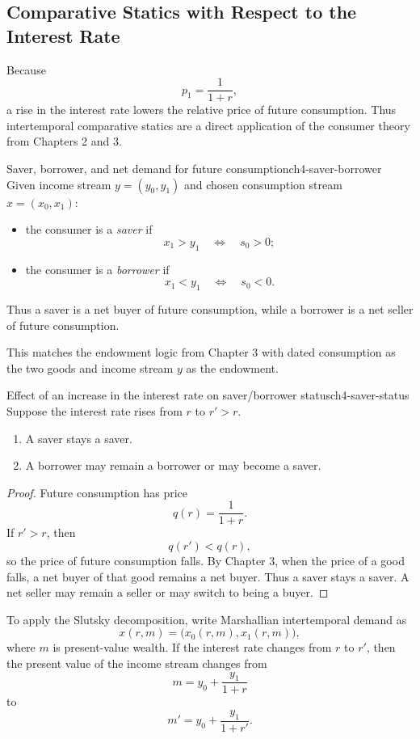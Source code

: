 \subsection{Comparative Statics with Respect to the Interest Rate}

Because
\[
p_1=\frac{1}{1+r},
\]
a rise in the interest rate lowers the relative price of future consumption. Thus intertemporal comparative statics are a direct application of the consumer theory from Chapters 2 and 3.

\begin{definition}{Saver, borrower, and net demand for future consumption}{ch4-saver-borrower}
Given income stream $y=(y_0,y_1)$ and chosen consumption stream $x=(x_0,x_1)$:
\begin{itemize}
    \item the consumer is a \emph{saver} if
    \[
    x_1>y_1
    \quad \Longleftrightarrow \quad
    s_0>0;
    \]
    \item the consumer is a \emph{borrower} if
    \[
    x_1<y_1
    \quad \Longleftrightarrow \quad
    s_0<0.
    \]
\end{itemize}
Thus a saver is a net buyer of future consumption, while a borrower is a net seller of future consumption.
\end{definition}

This matches the endowment logic from Chapter 3 with dated consumption as the two goods and income stream $y$ as the endowment.

\begin{theorem}{Effect of an increase in the interest rate on saver/borrower status}{ch4-saver-status}
Suppose the interest rate rises from $r$ to $r'>r$.
\begin{enumerate}
    \item A saver stays a saver.
    \item A borrower may remain a borrower or may become a saver.
\end{enumerate}
\end{theorem}

\begin{proof}
Future consumption has price
\[
q(r)=\frac{1}{1+r}.
\]
If $r'>r$, then
\[
q(r')<q(r),
\]
so the price of future consumption falls. By Chapter 3, when the price of a good falls, a net buyer of that good remains a net buyer. Thus a saver stays a saver. A net seller may remain a seller or may switch to being a buyer.
\end{proof}

To apply the Slutsky decomposition, write Marshallian intertemporal demand as
\[
x(r,m)=\bigl(x_0(r,m),x_1(r,m)\bigr),
\]
where $m$ is present-value wealth. If the interest rate changes from $r$ to $r'$, then the present value of the income stream changes from
\[
m=y_0+\frac{y_1}{1+r}
\]
to
\[
m'=y_0+\frac{y_1}{1+r'}.
\]

